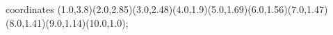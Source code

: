 					coordinates { (1.0,3.8)(2.0,2.85)(3.0,2.48)(4.0,1.9)(5.0,1.69)(6.0,1.56)(7.0,1.47)(8.0,1.41)(9.0,1.14)(10.0,1.0)};